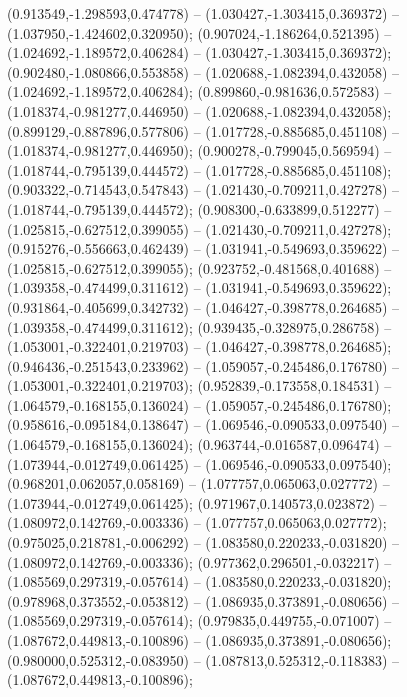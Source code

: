 (0.913549,-1.298593,0.474778) -- (1.030427,-1.303415,0.369372) -- (1.037950,-1.424602,0.320950);
 (0.907024,-1.186264,0.521395) -- (1.024692,-1.189572,0.406284) -- (1.030427,-1.303415,0.369372);
 (0.902480,-1.080866,0.553858) -- (1.020688,-1.082394,0.432058) -- (1.024692,-1.189572,0.406284);
 (0.899860,-0.981636,0.572583) -- (1.018374,-0.981277,0.446950) -- (1.020688,-1.082394,0.432058);
 (0.899129,-0.887896,0.577806) -- (1.017728,-0.885685,0.451108) -- (1.018374,-0.981277,0.446950);
 (0.900278,-0.799045,0.569594) -- (1.018744,-0.795139,0.444572) -- (1.017728,-0.885685,0.451108);
 (0.903322,-0.714543,0.547843) -- (1.021430,-0.709211,0.427278) -- (1.018744,-0.795139,0.444572);
 (0.908300,-0.633899,0.512277) -- (1.025815,-0.627512,0.399055) -- (1.021430,-0.709211,0.427278);
 (0.915276,-0.556663,0.462439) -- (1.031941,-0.549693,0.359622) -- (1.025815,-0.627512,0.399055);
 (0.923752,-0.481568,0.401688) -- (1.039358,-0.474499,0.311612) -- (1.031941,-0.549693,0.359622);
 (0.931864,-0.405699,0.342732) -- (1.046427,-0.398778,0.264685) -- (1.039358,-0.474499,0.311612);
 (0.939435,-0.328975,0.286758) -- (1.053001,-0.322401,0.219703) -- (1.046427,-0.398778,0.264685);
 (0.946436,-0.251543,0.233962) -- (1.059057,-0.245486,0.176780) -- (1.053001,-0.322401,0.219703);
 (0.952839,-0.173558,0.184531) -- (1.064579,-0.168155,0.136024) -- (1.059057,-0.245486,0.176780);
 (0.958616,-0.095184,0.138647) -- (1.069546,-0.090533,0.097540) -- (1.064579,-0.168155,0.136024);
 (0.963744,-0.016587,0.096474) -- (1.073944,-0.012749,0.061425) -- (1.069546,-0.090533,0.097540);
 (0.968201,0.062057,0.058169) -- (1.077757,0.065063,0.027772) -- (1.073944,-0.012749,0.061425);
 (0.971967,0.140573,0.023872) -- (1.080972,0.142769,-0.003336) -- (1.077757,0.065063,0.027772);
 (0.975025,0.218781,-0.006292) -- (1.083580,0.220233,-0.031820) -- (1.080972,0.142769,-0.003336);
 (0.977362,0.296501,-0.032217) -- (1.085569,0.297319,-0.057614) -- (1.083580,0.220233,-0.031820);
 (0.978968,0.373552,-0.053812) -- (1.086935,0.373891,-0.080656) -- (1.085569,0.297319,-0.057614);
 (0.979835,0.449755,-0.071007) -- (1.087672,0.449813,-0.100896) -- (1.086935,0.373891,-0.080656);
 (0.980000,0.525312,-0.083950) -- (1.087813,0.525312,-0.118383) -- (1.087672,0.449813,-0.100896);
